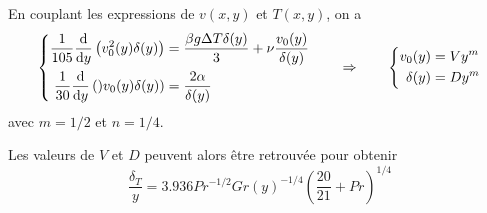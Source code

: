     En couplant les expressions de $v(x,y)$ et $T(x,y)$, on a
    \begin{equation}
      \left\{
        \begin{aligned}
          \frac{1}{105} \dv{y}\left(v^2_0 (y)\delta(y)\right) &= \frac{\beta g \Delta T \delta(y)}{3} + \nu \frac{v_0(y)}{\delta(y)}\\
          \frac{1}{30} \dv{y}\left() v_0(y) \delta(y)\right) &= \frac{2\alpha}{\delta(y)}
        \end{aligned}
      \right.
      \qquad \Rightarrow \qquad
      \left\{
        \begin{aligned}
          v_0(y) &= Vy^m\\
          \delta(y) &= D y^m
        \end{aligned}
      \right.
    \end{equation}
    avec $ m = 1/2$ et $n = 1/4$.

    Les valeurs de $V$ et $D$ peuvent alors être retrouvée pour obtenir
    \begin{equation}
      \frac{\delta_T}{y} = 3.936 Pr^{-1/2} Gr(y)^{-1/4} \left(\frac{20}{21} + Pr\right)^{1/4}
    \end{equation}
